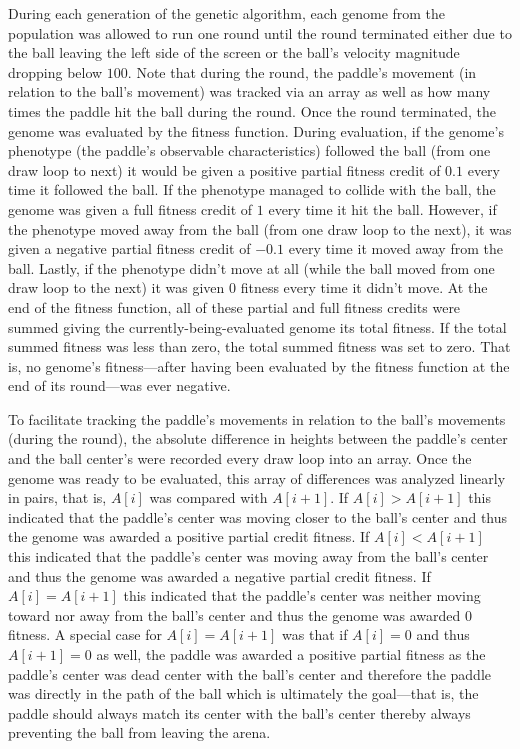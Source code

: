\documentclass[a4paper,10pt]{article}
\begin{document}
During each generation of the genetic algorithm, each genome from the population was allowed to run one round until the round terminated either due to the ball leaving the left side of the screen or the ball's velocity magnitude dropping below $100$. Note that during the round, the paddle's movement (in relation to the ball's movement) was tracked via an array as well as how many times the paddle hit the ball during the round. Once the round terminated, the genome was evaluated by the fitness function. During evaluation, if the genome's phenotype (the paddle's observable characteristics) followed the ball (from one draw loop to next) it would be given a positive partial fitness credit of $0.1$ every time it followed the ball. If the phenotype managed to collide with the ball, the genome was given a full fitness credit of $1$ every time it hit the ball. However, if the phenotype moved away from the ball (from one draw loop to the next), it was given a negative partial fitness credit of $-0.1$ every time it moved away from the ball. Lastly, if the phenotype didn't move at all (while the ball moved from one draw loop to the next) it was given $0$ fitness every time it didn't move. At the end of the fitness function, all of these partial and full fitness credits were summed giving the currently-being-evaluated genome its total fitness. If the total summed fitness was less than zero, the total summed fitness was set to zero. That is, no genome's fitness---after having been evaluated by the fitness function at the end of its round---was ever negative. 

To facilitate tracking the paddle's movements in relation to the ball's movements (during the round), the absolute difference in heights between the paddle's center and the ball center's were recorded every draw loop into an array. Once the genome was ready to be evaluated, this array of differences was analyzed linearly in pairs, that is, $A[i]$ was compared with $A[i+1]$. If $A[i]>A[i+1]$ this indicated that the paddle's center was moving closer to the ball's center and thus the genome was awarded a positive partial credit fitness. If $A[i]<A[i+1]$ this indicated that the paddle's center was moving away from the ball's center and thus the genome was awarded a negative partial credit fitness. If $A[i]=A[i+1]$ this indicated that the paddle's center was neither moving toward nor away from the ball's center and thus the genome was awarded $0$ fitness. A special case for $A[i]=A[i+1]$ was that if $A[i]=0$ and thus $A[i+1]=0$ as well, the paddle was awarded a positive partial fitness as the paddle's center was dead center with the ball's center and therefore the paddle was directly in the path of the ball which is ultimately the goal---that is, the paddle should always match its center with the ball's center thereby always preventing the ball from leaving the arena.
\end{document}
